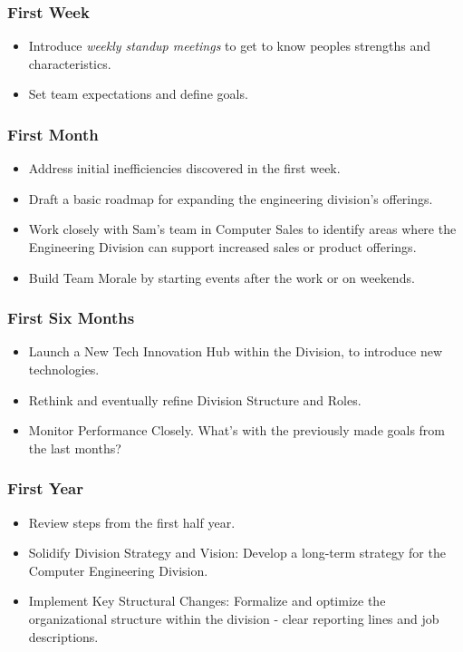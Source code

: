 \documentclass[a4paper,12pt]{article}
\begin{document}
\subsubsection{First Week}
\begin{itemize}
    \item Introduce \textit{weekly standup meetings} to get to know peoples strengths and characteristics.
    \item Set team expectations and define goals.
\end{itemize}

\subsubsection{First Month}
\begin{itemize}
    \item Address initial inefficiencies discovered in the first week.
    \item Draft a basic roadmap for expanding the engineering division’s offerings.
    \item Work closely with Sam’s team in Computer Sales to identify areas where the Engineering Division can support increased sales or product offerings.
    \item Build Team Morale by starting events after the work or on weekends.

\end{itemize}

\subsubsection{First Six Months}
\begin{itemize}
    \item Launch a New Tech Innovation Hub within the Division, to introduce new technologies.
    \item Rethink and eventually refine Division Structure and Roles.
    \item Monitor Performance Closely. What's with the previously made goals from the last months?
\end{itemize}

\subsubsection{First Year}
\begin{itemize}
    \item Review steps from the first half year.
    \item Solidify Division Strategy and Vision: Develop a long-term strategy for the Computer Engineering Division.
    \item Implement Key Structural Changes: Formalize and optimize the organizational structure within the division - clear reporting lines and job descriptions. 
\end{itemize}
\end{document}
